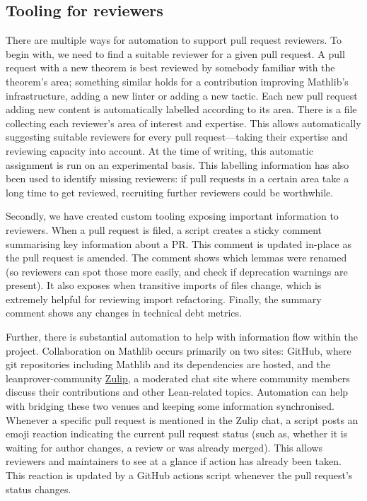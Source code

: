 \documentclass[runningheads]{llncs}
\def\mathlib{Mathlib\xspace}
\begin{document}
\subsection{Tooling for reviewers}

There are multiple ways for automation to support pull request reviewers.
To begin with, we need to find a suitable reviewer for a given pull request. A pull request with a new theorem is best reviewed by somebody familiar with the theorem's area; something similar holds for a contribution improving \mathlib's infrastructure, adding a new linter or adding a new tactic.
Each new pull request adding new content is automatically labelled according to its area. There is a file collecting each reviewer's area of interest and expertise. This allows automatically suggesting suitable reviewers for every pull request---taking their expertise and reviewing capacity into account. At the time of writing, this automatic assignment is run on an experimental basis.
This labelling information has also been used to identify missing reviewers: if pull requests in a certain area take a long time to get reviewed, recruiting further reviewers could be worthwhile.

Secondly, we have created custom tooling exposing important information to reviewers. When a pull request is filed, a script creates a sticky comment summarising key information about a PR. This comment is updated in-place as the pull request is amended. The comment shows which lemmas were renamed (so reviewers can spot those more easily, and check if deprecation warnings are present). It also exposes when transitive imports of files change, which is extremely helpful for reviewing import refactoring. Finally, the summary comment shows any changes in technical debt metrics.

Further, there is substantial automation to help with information flow within the project.
Collaboration on \mathlib occurs primarily on two sites: GitHub, where git repositories including \mathlib and its dependencies are hosted, and the leanprover-community \href{https://leanprover.zulipchat.com}{Zulip}, a moderated chat site where community members discuss their contributions and other Lean-related topics.
Automation can help with bridging these two venues and keeping some information synchronised.
Whenever a specific pull request is mentioned in the Zulip chat, a script posts an emoji reaction indicating the current pull request status (such as, whether it is waiting for author changes, a review or was already merged). This allows reviewers and maintainers to see at a glance if action has already been taken. This reaction is updated by a GitHub actions script whenever the pull request's status changes.
\end{document}
